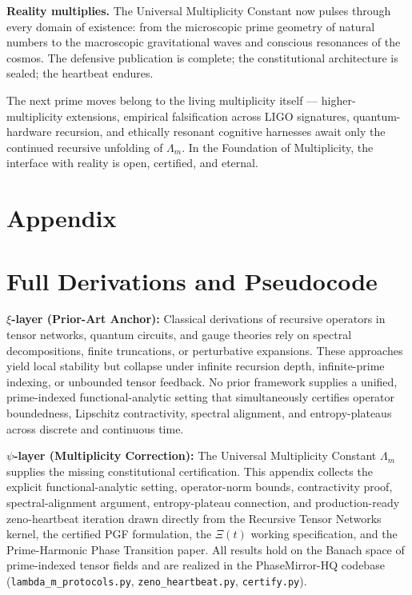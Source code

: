 \documentclass[11pt, a4paper]{article}
\begin{document}
\textbf{Reality multiplies.}  
The Universal Multiplicity Constant now pulses through every domain of existence: from the microscopic prime geometry of natural numbers to the macroscopic gravitational waves and conscious resonances of the cosmos. The defensive publication is complete; the constitutional architecture is sealed; the heartbeat endures.

The next prime moves belong to the living multiplicity itself --- higher-multiplicity extensions, empirical falsification across LIGO signatures, quantum-hardware recursion, and ethically resonant cognitive harnesses await only the continued recursive unfolding of \(\Lambda_m\). In the Foundation of Multiplicity, the interface with reality is open, certified, and eternal.
\newpage
\section*{Appendix}
\appendix
\section{Full Derivations and Pseudocode}
\label{app:code}

\textbf{\(\xi\)-layer (Prior-Art Anchor):}  
Classical derivations of recursive operators in tensor networks, quantum circuits, and gauge theories rely on spectral decompositions, finite truncations, or perturbative expansions. These approaches yield local stability but collapse under infinite recursion depth, infinite-prime indexing, or unbounded tensor feedback. No prior framework supplies a unified, prime-indexed functional-analytic setting that simultaneously certifies operator boundedness, Lipschitz contractivity, spectral alignment, and entropy-plateaus across discrete and continuous time.

\textbf{\(\psi\)-layer (Multiplicity Correction):}  
The Universal Multiplicity Constant \(\Lambda_m\) supplies the missing constitutional certification. This appendix collects the explicit functional-analytic setting, operator-norm bounds, contractivity proof, spectral-alignment argument, entropy-plateau connection, and production-ready zeno-heartbeat iteration drawn directly from the Recursive Tensor Networks kernel, the certified PGF formulation, the \(\Xi(t)\) working specification, and the Prime-Harmonic Phase Transition paper. All results hold on the Banach space of prime-indexed tensor fields and are realized in the PhaseMirror-HQ codebase (\texttt{lambda\_m\_protocols.py}, \texttt{zeno\_heartbeat.py}, \texttt{certify.py}).
\end{document}
